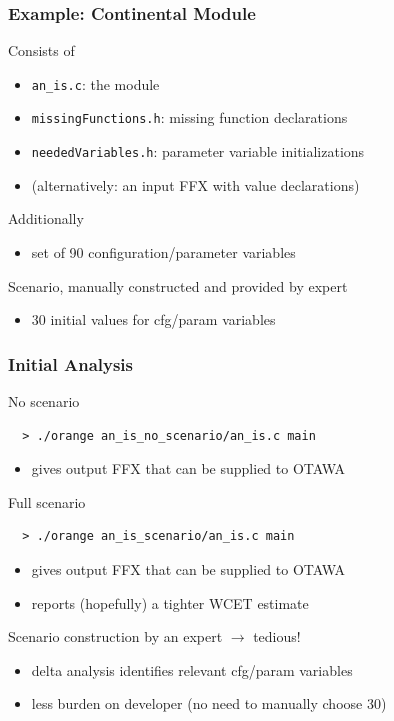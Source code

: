 \documentclass{beamer}
\begin{document}
\begin{frame}[fragile]
  \frametitle{Example: Continental Module}

  \bigskip
  Consists of
  \begin{itemize}
    \item {\tt an\_is.c}: the module
    \item {\tt missingFunctions.h}: missing function declarations 
    \item {\tt neededVariables.h}: parameter variable initializations
    \item (alternatively: an input FFX with value declarations)
  \end{itemize}

  \bigskip
  Additionally 
  \begin{itemize}
    \item set of 90 configuration/parameter variables
  \end{itemize}

  \bigskip
  Scenario, manually constructed and provided by expert
  \begin{itemize}
    \item 30 initial values for cfg/param variables
  \end{itemize}
\end{frame} 



\begin{frame}[fragile]
  \frametitle{Initial Analysis}

  \bigskip
  No scenario \\
  {\small 
  \begin{verbatim}
  > ./orange an_is_no_scenario/an_is.c main
  \end{verbatim}
  }
  \vspace{-.4cm}
  \begin{itemize}
    \item gives output FFX that can be supplied to OTAWA
  \end{itemize}

  \bigskip
  Full scenario \\
  {\small
  \begin{verbatim}
  > ./orange an_is_scenario/an_is.c main
  \end{verbatim}
  }
  \vspace{-.4cm}
  \begin{itemize}
    \item gives output FFX that can be supplied to OTAWA
    \item reports (hopefully) a tighter WCET estimate
  \end{itemize}

  \bigskip
  Scenario construction by an expert $\rightarrow$ tedious!
  \begin{itemize}
    \item delta analysis identifies relevant cfg/param variables
    \item less burden on developer (no need to manually choose 30)
  \end{itemize}
\end{frame}
\end{document}

